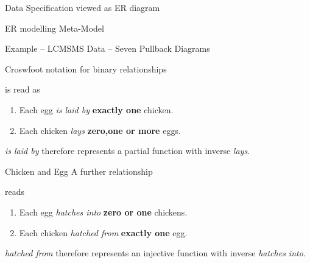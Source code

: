 \documentclass[xcolor=pst,dvips]{beamer}   %
\renewcommand{\erpictureFolder}[0]{../SharedPictures}
\begin{document}
\begin{frame}{Data Specification viewed as ER diagram}
\begin{center}
\scalebox{0.5}{

}
\end{center}
\end{frame}
\begin{frame}{ER modelling Meta-Model}
\scalebox{0.23}{

}
\end{frame}
\begin{frame}{Example -- LCMSMS Data -- Seven Pullback Diagrams}
\scalebox{0.2}{

}
\end{frame}

\begin{frame}{Croswfoot notation for binary relationships}
\begin{center}
\scalebox{0.9}{

}
\end{center}
is read as
\begin{center}
\begin{enumerate}
\item Each egg \textit{is laid by} \textbf{exactly one} chicken.
\item Each chicken \textit{lays} \textbf{zero,one or more} eggs.
\end{enumerate}
\end{center}
 \textit{is laid by} therefore represents a partial function with inverse \textit{lays}.
\end{frame}

\begin{frame}{Chicken and Egg}
A further relationship 
\begin{center}
\scalebox{0.9}{

}
\end{center}
reads
\begin{center}
\begin{enumerate}
\item Each egg \textit{hatches into} \textbf{zero or one} chickens.
\item Each chicken \textit{hatched from} \textbf{exactly one} egg.
\end{enumerate}
\end{center}
 \textit{hatched from} therefore represents an injective function with inverse \textit{hatches into}.
\end{frame}
\end{document}
